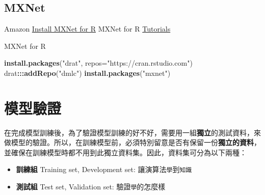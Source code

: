 \documentclass[]{book}
\newenvironment{Shaded}{\begin{snugshade}}{\end{snugshade}}
\newcommand{\DataTypeTok}[1]{\textcolor[rgb]{0.13,0.29,0.53}{#1}}
\newcommand{\KeywordTok}[1]{\textcolor[rgb]{0.13,0.29,0.53}{\textbf{#1}}}
\newcommand{\NormalTok}[1]{#1}
\newcommand{\OperatorTok}[1]{\textcolor[rgb]{0.81,0.36,0.00}{\textbf{#1}}}
\newcommand{\StringTok}[1]{\textcolor[rgb]{0.31,0.60,0.02}{#1}}
\providecommand{\tightlist}{%
  \setlength{\itemsep}{0pt}\setlength{\parskip}{0pt}}
\begin{document}
\begin{Shaded}
\end{Shaded}

\hypertarget{mxnet}{%
\subsection{MXNet}\label{mxnet}}

Amazon
\href{http://mxnet.io/get_started/windows_setup.html\#install-mxnet-for-r}{Install MXNet for R}
MXNet for R \href{http://mxnet.io/tutorials/index.html\#r}{Tutorials}

MXNet for R

\begin{Shaded}
\begin{Highlighting}[]
\KeywordTok{install.packages}\NormalTok{(}\StringTok{"drat"}\NormalTok{, }\DataTypeTok{repos=}\StringTok{"https://cran.rstudio.com"}\NormalTok{)}
\NormalTok{drat}\OperatorTok{:::}\KeywordTok{addRepo}\NormalTok{(}\StringTok{"dmlc"}\NormalTok{)}
\KeywordTok{install.packages}\NormalTok{(}\StringTok{"mxnet"}\NormalTok{)}
\end{Highlighting}
\end{Shaded}

\hypertarget{ux6a21ux578bux9a57ux8b49}{%
\section{模型驗證}\label{ux6a21ux578bux9a57ux8b49}}

在完成模型訓練後，為了驗證模型訓練的好不好，需要用一組\textbf{獨立}的測試資料，來做模型的驗證。所以，在訓練模型前，必須特別留意是否有保留一份\textbf{獨立的資料}，並確保在訓練模型時都不用到此獨立資料集。因此，資料集可分為以下兩種：

\begin{itemize}
\tightlist
\item
  \textbf{訓練組} Training set, Development set: 讓演算法\texttt{學}到\texttt{知識}
\item
  \textbf{測試組} Test set, Validation set: 驗證\texttt{學}的怎麼樣
\end{itemize}
\end{document}
